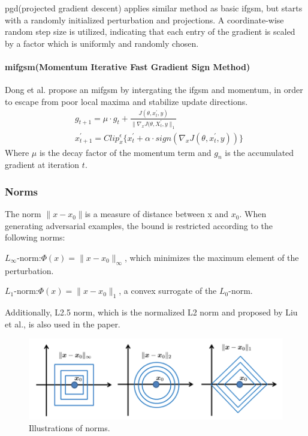 \acrshort{pgd}(projected gradient descent) applies similar method as basic \acrshort{ifgsm}, but starts with a randomly initialized perturbation and projections. A coordinate-wise random step size is utilized, indicating that each entry of the gradient is scaled by a factor which is uniformly and randomly chosen\cite{madry_towards_2019}.
\paragraph{\acrshort{mifgsm}(Momentum Iterative Fast Gradient Sign Method)}
Dong et al. propose an \acrshort{mifgsm} by intergating the \acrshort{ifgsm} and momentum, in order to escape from poor local maxima and stabilize update directions\cite{dong_boosting_2018}. 
 \begin{equation}
 \begin{split}
          & g_{t+1} = \mu \cdot g_{t}+\frac{J(\theta,x^{'}_{t},y)}{\|\nabla_{x}J(\theta,X_{t}^{'},y\|_{1}}\\
          &x_{t+1}^{'}=Clip^{\epsilon}_{x}\{x_{t}^{'}+\alpha \cdot sign(\nabla_{x}J(\theta,x_{t}^{'},y))\} 
\end{split}
\end{equation}
Where \(\mu\) is the decay factor of the momentum term and \(g_{n}\) is the accumulated gradient at iteration \(t\).

\subsubsection{Norms}

The norm \(\|x - x_{0}\| \)is a measure of distance between x and \(x_{0}\). When generating adversarial examples, the bound is restricted according to the following norms:

\(L_{\infty}\)-norm:\(\Phi(x) =\|x \minus x_{0}\|_{\infty} \), which minimizes the maximum element of the perturbation.

\(L_{1}\)-norm:\(\Phi(x) =\|x \minus x_{0}\|_{1} \),  a convex surrogate of the \(L_{0}\)-norm.



Additionally, L2.5 norm, which is the normalized L2 norm and proposed by Liu et al.\cite{liu_extending_2019}, is also used in the paper.
 \begin{figure}[!htbp]
\centering
\includegraphics[scale=0.5]{Graphics/Norms.png}
\caption{Illustrations of norms.}
\label{fig:Norm}
\end{figure}
 
